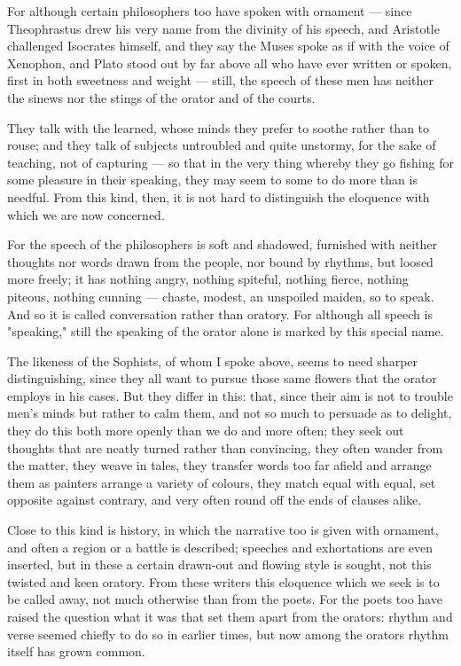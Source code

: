  For although certain philosophers too have spoken with ornament — since Theophrastus drew his very name from the divinity of his speech, and Aristotle challenged Isocrates himself, and they say the Muses spoke as if with the voice of Xenophon, and Plato stood out by far above all who have ever written or spoken, first in both sweetness and weight — still, the speech of these men has neither the sinews nor the stings of the orator and of the courts.

 They talk with the learned, whose minds they prefer to soothe rather than to rouse; and they talk of subjects untroubled and quite unstormy, for the sake of teaching, not of capturing — so that in the very thing whereby they go fishing for some pleasure in their speaking, they may seem to some to do more than is needful. From this kind, then, it is not hard to distinguish the eloquence with which we are now concerned.

 For the speech of the philosophers is soft and shadowed, furnished with neither thoughts nor words drawn from the people, nor bound by rhythms, but loosed more freely; it has nothing angry, nothing spiteful, nothing fierce, nothing piteous, nothing cunning — chaste, modest, an unspoiled maiden, so to speak. And so it is called conversation rather than oratory. For although all speech is "speaking," still the speaking of the orator alone is marked by this special name.

 The likeness of the Sophists, of whom I spoke above, seems to need sharper distinguishing, since they all want to pursue those same flowers that the orator employs in his cases. But they differ in this: that, since their aim is not to trouble men's minds but rather to calm them, and not so much to persuade as to delight, they do this both more openly than we do and more often; they seek out thoughts that are neatly turned rather than convincing, they often wander from the matter, they weave in tales, they transfer words too far afield and arrange them as painters arrange a variety of colours, they match equal with equal, set opposite against contrary, and very often round off the ends of clauses alike.

 Close to this kind is history, in which the narrative too is given with ornament, and often a region or a battle is described; speeches and exhortations are even inserted, but in these a certain drawn-out and flowing style is sought, not this twisted and keen oratory. From these writers this eloquence which we seek is to be called away, not much otherwise than from the poets. For the poets too have raised the question what it was that set them apart from the orators: rhythm and verse seemed chiefly to do so in earlier times, but now among the orators rhythm itself has grown common.

